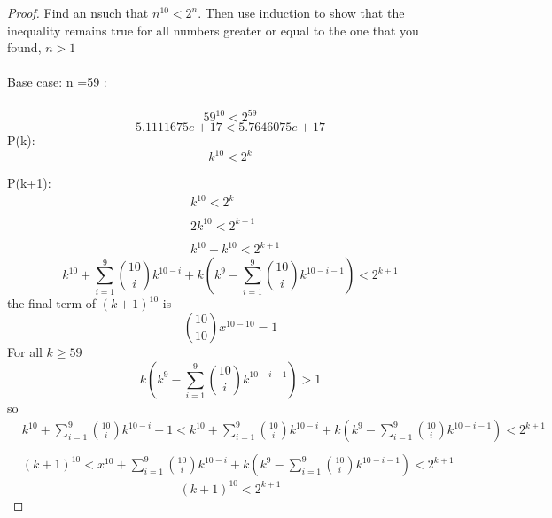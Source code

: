 \documentclass[12pt]{article}
\theoremstyle{definition}
\theoremstyle{remark}
\numberwithin{equation}{section}
\begin{document}
\begin{proof}
  Find an nsuch that $n^{10} <2^n$. Then use induction to show that the inequality remains
true for all numbers greater or equal to the one that you found, $n>1$\\\\
Base case: n =59 : \\\\
\[
  59^{10}<2^{59}
\]
\[
   5.1111675e+17<5.7646075e+17
\]
P(k):\\
\[
  k^{10}<2^k
\]

P(k+1):
\begin{align*}
  &k^{10}<2^k\\\\
  &2k^{10}<2^{k+1}\\\\
  &k^{10}+k^{10}<2^{k+1}
\end{align*}
$$
  k^{10} +\sum_{i=1}^9\binom{10}{i}k^{10-i}+k(k^9-\sum_{i=1}^9\binom{10}{i}k^{10-i-1})<2^{k+1}
$$
the final term of $(k+1)^{10}$ is
\[
  \binom{10}{10}x^{10-10}=1
\]
For all $k\geq 59$ $$ k(k^9-\sum_{i=1}^9\binom{10}{i}k^{10-i-1})>1$$ so
\begin{align*}
  &k^{10} +\sum_{i=1}^9\binom{10}{i}k^{10-i}+1<k^{10} +\sum_{i=1}^9\binom{10}{i}k^{10-i}+k(k^9-\sum_{i=1}^9\binom{10}{i}k^{10-i-1})<2^{k+1}\\\\
    &(k+1)^{10}<x^{10} +\sum_{i=1}^9\binom{10}{i}k^{10-i}+k(k^9-\sum_{i=1}^9\binom{10}{i}k^{10-i-1})<2^{k+1}
\end{align*}
\[
  (k+1)^{10}<2^{k+1}
\]
\end{proof}
\end{document}
